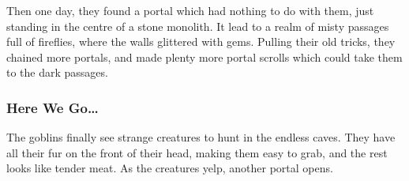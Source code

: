 \begin{multicols}{2}
Then one day, they found a portal which had nothing to do with them, just standing in the centre of a stone monolith.
It lead to a realm of misty passages full of fireflies, where the walls glittered with gems.
Pulling their old tricks, they chained more portals, and made plenty more portal scrolls which could take them to the dark passages.

\subsubsection{Here We Go\ldots}

\begin{exampletext}
  The goblins finally see strange creatures to hunt in the endless caves.
  They have all their fur on the front of their head, making them easy to grab, and the rest looks like tender meat.
  As the creatures yelp, another portal opens.
\end{exampletext}

\end{multicols}

